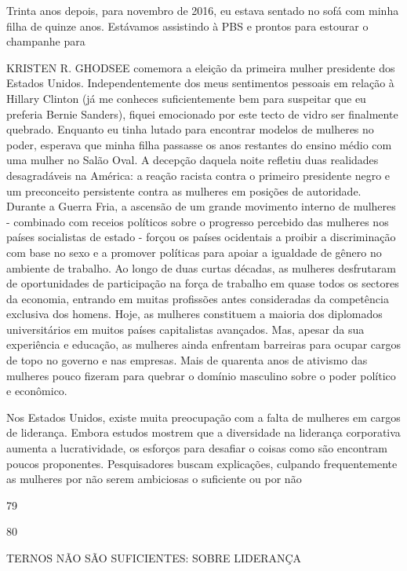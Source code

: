  \par 
Trinta anos depois, para novembro de 2016, eu estava sentado no sofá com minha filha de quinze anos. Estávamos assistindo à PBS e prontos para estourar o champanhe para
 \par 
KRISTEN R. GHODSEE comemora a eleição da primeira mulher presidente dos Estados Unidos. Independentemente dos meus sentimentos pessoais em relação à Hillary Clinton (já me conheces suficientemente bem para suspeitar que eu preferia Bernie Sanders), fiquei emocionado por este tecto de vidro ser finalmente quebrado. Enquanto eu tinha lutado para encontrar modelos de mulheres no poder, esperava que minha filha passasse os anos restantes do ensino médio com uma mulher no Salão Oval. A decepção daquela noite refletiu duas realidades desagradáveis ​​na América: a reação racista contra o primeiro presidente negro e um preconceito persistente contra as mulheres em posições de autoridade. Durante a Guerra Fria, a ascensão de um grande movimento interno de mulheres - combinado com receios políticos sobre o progresso percebido das mulheres nos países socialistas de estado - forçou os países ocidentais a proibir a discriminação com base no sexo e a promover políticas para apoiar a igualdade de gênero no ambiente de trabalho. Ao longo de duas curtas décadas, as mulheres desfrutaram de oportunidades de participação na força de trabalho em quase todos os sectores da economia, entrando em muitas profissões antes consideradas da competência exclusiva dos homens. Hoje, as mulheres constituem a maioria dos diplomados universitários em muitos países capitalistas avançados. Mas, apesar da sua experiência e educação, as mulheres ainda enfrentam barreiras para ocupar cargos de topo no governo e nas empresas. Mais de quarenta anos de ativismo das mulheres pouco fizeram para quebrar o domínio masculino sobre o poder político e econômico.
 \par 
Nos Estados Unidos, existe muita preocupação com a falta de mulheres em cargos de liderança. Embora estudos mostrem que a diversidade na liderança corporativa aumenta a lucratividade, os esforços para desafiar o coisas como são encontram poucos proponentes. Pesquisadores buscam explicações, culpando frequentemente as mulheres por não serem ambiciosas o suficiente ou por não
 \par 
79
 \par 
80
 \par 
TERNOS NÃO SÃO SUFICIENTES: SOBRE LIDERANÇA
 \par 
